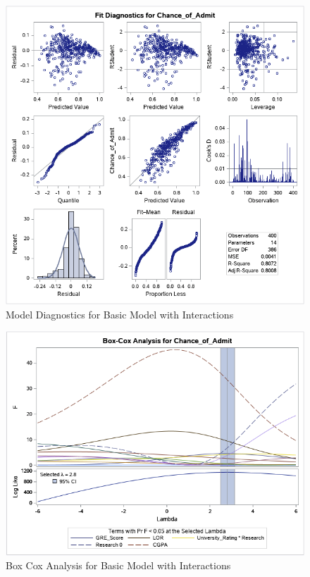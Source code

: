 \documentclass{article}
\begin{document}
\begin{figure}
\centering
\includegraphics[scale=0.6]{basic_model_diagnostics.png}
\caption{Model Diagnostics for Basic Model with Interactions}
\label{fig:basicmodeldiagnostics}
\end{figure}

\begin{figure}
\centering
\includegraphics[scale=0.5]{box_cox_analysis.png}
\caption{Box Cox Analysis for Basic Model with Interactions}
\label{fig:boxcoxanalysis}
\end{figure}
\end{document}
